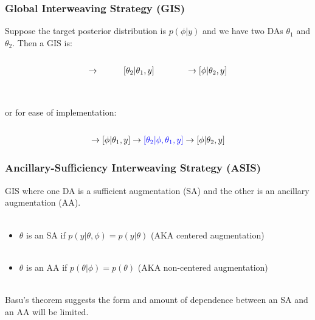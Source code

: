 \documentclass[xcolor=dvipsnames]{beamer}
\begin{document}
\begin{frame}
\frametitle{Global Interweaving Strategy (GIS)}
Suppose the target posterior distribution is $p(\phi|y)$ and we have two DAs $\theta_1$ and $\theta_2$. Then a GIS is: \\~
\begin{align*}
[\theta_1|\phi,y] \to \hspace{1cm} [\theta_2|\theta_1,y] \hspace{1.3cm} \to [\phi|\theta_2,y]
\end{align*}\\~\\
\pause or for ease of implementation:\\~
\begin{align*}
[\theta_1|\phi,y] \to [\phi|\theta_1,y] \to {\color{blue}[\theta_2|\phi,\theta_1,y]} \to [\phi|\theta_2,y]
\end{align*}
\end{frame}

\begin{frame}
\frametitle{Ancillary-Sufficiency Interweaving Strategy (ASIS)} 
GIS where one DA is a sufficient augmentation (SA) and the other is an ancillary augmentation (AA).\\~\\
\begin{itemize}
\item$\theta$ is an SA if $p(y|\theta,\phi)=p(y|\theta)$ (AKA centered augmentation)\\~\\
\item$\theta$ is an AA if $p(\theta|\phi)=p(\theta)$ (AKA non-centered augmentation)\\~\\
\end{itemize}
\pause Basu's theorem suggests the form and amount of dependence between an SA and an AA will be limited.
\end{frame}
\end{document}
